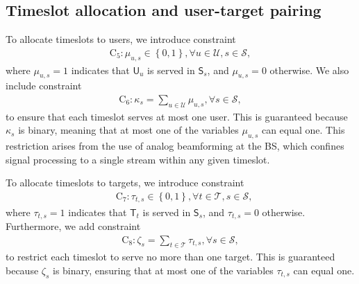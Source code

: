 \documentclass[10pt,journal,compsoc]{IEEEtran}
\theoremstyle{myremark}
\theoremstyle{myexample}
\begin{document}
\subsection{Timeslot allocation and user-target pairing} 
To allocate timeslots to users, we introduce constraint
\begin{align*}  
	\mathrm{C}_{5}: \mu_{u,s} \in \left\lbrace 0, 1 \right\rbrace, \forall u \in \mathcal{U}, s \in \mathcal{S},   
\end{align*}
where $ \mu_{u,s} = 1 $ indicates that $ \mathsf{U}_u $ is served in $ \mathsf{S}_s $, and $ \mu_{u,s} = 0 $ otherwise. We also include constraint
\begin{align*}  
	\textstyle
	\mathrm{C}_{6}: \kappa_s = \sum_{u \in \mathcal{U}} \mu_{u,s}, \forall s \in \mathcal{S},  
\end{align*}
to ensure that each timeslot serves at most one user. This is guaranteed because $ \kappa_s $ is binary, meaning that at most one of the variables $ \mu_{u,s} $ can equal one. This restriction arises from the use of analog beamforming at the \gls{BS}, which confines signal processing to a single stream within any given timeslot.
 


To allocate timeslots to targets, we introduce constraint 
\begin{align*}  
	& \mathrm{C}_{7}: \tau_{t,s} \in \left\lbrace 0, 1 \right\rbrace, \forall t \in \mathcal{T}, s \in \mathcal{S},   
\end{align*}
where $ \tau_{t,s} = 1 $ indicates that $ \mathsf{T}_t $ is served in $ \mathsf{S}_s $, and $ \tau_{t,s} = 0 $ otherwise. Furthermore, we add constraint 
\begin{align*}  
	\textstyle
 	\mathrm{C}_{8}: \zeta_s = \sum_{t \in \mathcal{T}} \tau_{t,s}, \forall s \in \mathcal{S},   
\end{align*}
to restrict each timeslot to serve no more than one target. This is guaranteed because $ \zeta_s $ is binary, ensuring that at most one of the variables $ \tau_{t,s} $ can equal one.
\end{document}
